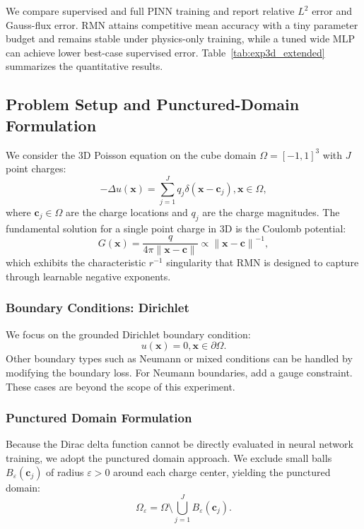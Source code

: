 \documentclass[twoside,11pt]{article}
\newcommand{\bx}{\bm{x}}
\newcommand{\bc}{\bm{c}}
\newcommand{\norm}[1]{\left\|#1\right\|}
\begin{document}
We compare supervised and full PINN training and report relative $L^2$ error and Gauss-flux error. RMN attains competitive mean accuracy with a tiny parameter budget and remains stable under physics-only training, while a tuned wide MLP can achieve lower best-case supervised error. Table~\ref{tab:exp3d_extended} summarizes the quantitative results.

\subsection{Problem Setup and Punctured-Domain Formulation}

We consider the 3D Poisson equation on the cube domain $\Omega = [-1,1]^3$ with $J$ point charges:
\begin{equation}
	-\Delta u(\bx) = \sum_{j=1}^{J} q_j \delta(\bx - \bc_j), \bx \in \Omega,
	\label{eq:poisson3d}
\end{equation}
where $\bc_j \in \Omega$ are the charge locations and $q_j$ are the charge magnitudes. The fundamental solution for a single point charge in 3D is the Coulomb potential:
\begin{equation}
	G(\bx) = \frac{q}{4\pi\norm{\bx - \bc}} \propto \norm{\bx - \bc}^{-1},
\end{equation}
which exhibits the characteristic $r^{-1}$ singularity that RMN is designed to capture through learnable negative exponents.

\subsubsection{Boundary Conditions: Dirichlet}

We focus on the grounded Dirichlet boundary condition:
\begin{equation}
	u(\bx) = 0, \bx \in \partial\Omega.
\end{equation}
Other boundary types such as Neumann or mixed conditions can be handled by modifying the boundary loss. For Neumann boundaries, add a gauge constraint. These cases are beyond the scope of this experiment.

\subsubsection{Punctured Domain Formulation}

Because the Dirac delta function cannot be directly evaluated in neural network training, we adopt the punctured domain approach. We exclude small balls $B_\varepsilon(\bc_j)$ of radius $\varepsilon > 0$ around each charge center, yielding the punctured domain:
\begin{equation}
	\Omega_\varepsilon = \Omega \setminus \bigcup_{j=1}^{J} B_\varepsilon(\bc_j).
\end{equation}
\end{document}
